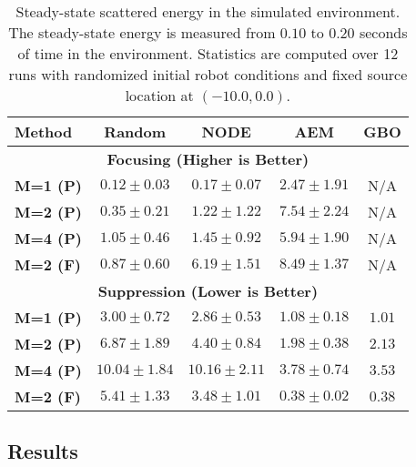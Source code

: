 \begin{table}%
\centering
\vspace{0.2cm}
\caption{Steady-state scattered energy in the simulated environment. The steady-state energy is measured from $0.10$ to $0.20$ seconds of time in the environment. Statistics are computed over 12 runs with randomized initial robot conditions and fixed source location at $(-10.0, 0.0)$.}
\label{tab:results_summary}
\begin{tabularx}{\linewidth}{l cccc}
\toprule
\textbf{Method} & \textbf{Random} & \textbf{NODE} & \textbf{AEM} & \textbf{GBO} \\
\midrule
\multicolumn{5}{c}{\textbf{Focusing (Higher is Better)}} \\
\textbf{M=1 (P)}     & $0.12 \pm 0.03$ & $0.17 \pm 0.07$ & $\mathbf{2.47 \pm 1.91}$ & N/A \\
\textbf{M=2 (P)}     & $0.35 \pm 0.21$ & $1.22 \pm 1.22$ & $\mathbf{7.54 \pm 2.24}$ & N/A \\
\textbf{M=4 (P)}     & $1.05 \pm 0.46$ & $1.45 \pm 0.92$ & $\mathbf{5.94 \pm 1.90}$ & N/A \\
\textbf{M=2 (F)}     & $0.87 \pm 0.60$ & $6.19 \pm 1.51$ & $\mathbf{8.49 \pm 1.37}$ & N/A \\
\midrule
\multicolumn{5}{c}{\textbf{Suppression (Lower is Better)}} \\
\textbf{M=1 (P)}     & $3.00 \pm 0.72$ & $2.86 \pm 0.53$ & $1.08 \pm 0.18$ & $\mathbf{1.01}$ \\
\textbf{M=2 (P)}     & $6.87 \pm 1.89$ & $4.40 \pm 0.84$ & $\mathbf{1.98 \pm 0.38}$ & $2.13$ \\
\textbf{M=4 (P)}     & $10.04 \pm 1.84$ & $10.16 \pm 2.11$ & $3.78 \pm 0.74$ & $\mathbf{3.53}$ \\
\textbf{M=2 (F)}     & $5.41 \pm 1.33$ & $3.48 \pm 1.01$ & $\mathbf{0.38 \pm 0.02}$ & $0.38$ \\
\bottomrule
\end{tabularx}
\end{table}


\subsection{Results}

